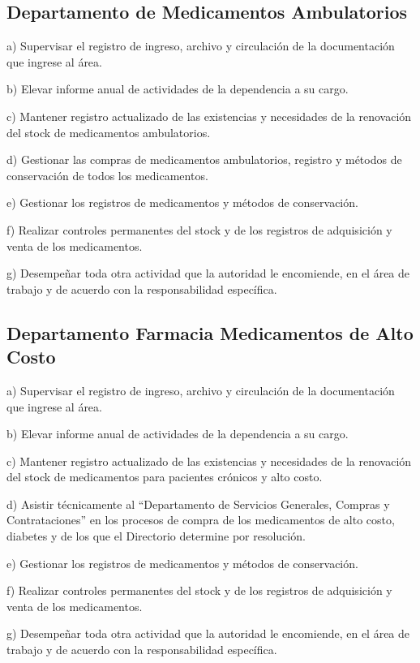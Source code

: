 \subsection{Departamento de Medicamentos Ambulatorios}
\begin{displayquote}
a) Supervisar el registro de ingreso, archivo y circulación de la documentación que ingrese al área.

b) Elevar informe anual de actividades de la dependencia a su cargo.

c) Mantener registro actualizado de las existencias y necesidades de la renovación del stock de medicamentos ambulatorios.

d) Gestionar las compras de medicamentos ambulatorios, registro y métodos de conservación de todos los medicamentos.

e) Gestionar los registros de medicamentos y métodos de conservación.

f) Realizar controles permanentes del stock y de los registros de adquisición y venta de los medicamentos.

g) Desempeñar toda otra actividad que la autoridad le encomiende, en el área de trabajo y de acuerdo con la responsabilidad específica.
\hfill\parencite{CSOrd17}
\end{displayquote}

\subsection{Departamento Farmacia Medicamentos de Alto Costo}
\begin{displayquote}
a) Supervisar el registro de ingreso, archivo y circulación de la documentación que ingrese al área.

b) Elevar informe anual de actividades de la dependencia a su cargo.

c) Mantener registro actualizado de las existencias y necesidades de la renovación del stock de medicamentos para pacientes crónicos y alto costo.

d) Asistir técnicamente al “Departamento de Servicios Generales, Compras y Contrataciones” en los procesos de compra de los medicamentos de alto costo, diabetes y de los que el Directorio determine por resolución.

e) Gestionar los registros de medicamentos y métodos de conservación.

f) Realizar controles permanentes del stock y de los registros de adquisición y venta de los medicamentos.

g) Desempeñar toda otra actividad que la autoridad le encomiende, en el área de trabajo y de acuerdo con la responsabilidad específica.
\hfill\parencite{CSOrd17}
\end{displayquote}

